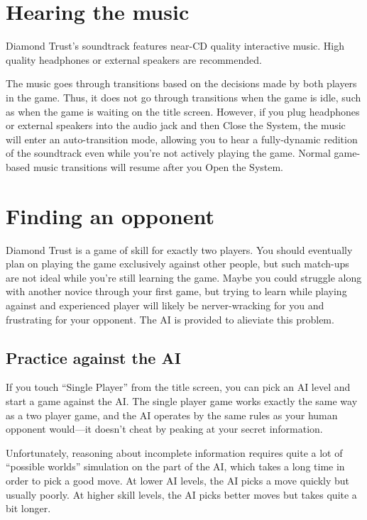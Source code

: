 \documentclass[8pt]{extbook}
\begin{document}
\section{Hearing the music}

Diamond Trust's soundtrack features near-CD quality interactive music.  High quality headphones or external speakers are recommended.  

The music goes through transitions based on the decisions made by both players in the game.  Thus, it does not go through transitions when the game is idle, such as when the game is waiting on the title screen.  However, if you plug headphones or external speakers into the audio jack and then Close the System, the music will enter an auto-transition mode, allowing you to hear a fully-dynamic redition of the soundtrack even while you're not actively playing the game.  Normal game-based music transitions will resume after you Open the System.

\section{Finding an opponent}

Diamond Trust is a game of skill for exactly two players.  You should eventually plan on playing the game exclusively against other people, but such match-ups are not ideal while you're still learning the game.  Maybe you could struggle along with another novice through your first game, but trying to learn while playing against and experienced player will likely be nerver-wracking for you and frustrating for your opponent.  The AI is provided to alieviate this problem.

\subsection{Practice against the AI}

If you touch ``Single Player'' from the title screen, you can pick an AI level and start a game against the AI.  The single player game works exactly the same way as a two player game, and the AI operates by the same rules as your human opponent would---it doesn't cheat by peaking at your secret information.

Unfortunately, reasoning about incomplete information requires quite a lot of ``possible worlds'' simulation on the part of the AI, which takes a long time in order to pick a good move.  At lower AI levels, the AI picks a move quickly but usually poorly.  At higher skill levels, the AI picks better moves but takes quite a bit longer.
\end{document}
